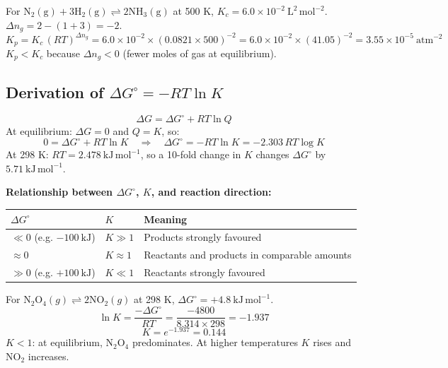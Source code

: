 \documentclass[12pt,a4paper]{article}
\begin{document}
\begin{tcolorbox}[examplebox, title={Solved Example: \texorpdfstring{$K_p$}{Kp} from \texorpdfstring{$K_c$}{Kc}}]
For $\mathrm{N_2(g) + 3H_2(g) \rightleftharpoons 2NH_3(g)}$ at 500 K, $K_c = 6.0\times10^{-2}\ \mathrm{L^2\,mol^{-2}}$.\\
$\Delta n_g = 2 - (1+3) = -2$.
\[
K_p = K_c\,(RT)^{\Delta n_g} = 6.0\times10^{-2}\times(0.0821\times500)^{-2}
= 6.0\times10^{-2}\times(41.05)^{-2} = 3.55\times10^{-5}\ \mathrm{atm^{-2}}
\]
$K_p < K_c$ because $\Delta n_g < 0$ (fewer moles of gas at equilibrium).
\end{tcolorbox}

\subsection{Derivation of \texorpdfstring{$\Delta G^\circ = -RT\ln K$}{Delta G0 = -RT ln K}}

\begin{tcolorbox}[formulabox, title={Free Energy and Equilibrium Constant}]
\[
\Delta G = \Delta G^\circ + RT\ln Q
\]
At equilibrium: $\Delta G = 0$ and $Q = K$, so:
\[
0 = \Delta G^\circ + RT\ln K \quad\Rightarrow\quad \boxed{\Delta G^\circ = -RT\ln K = -2.303\,RT\log K}
\]
At 298 K: $RT = 2.478\ \mathrm{kJ\,mol^{-1}}$, so a 10-fold change in $K$ changes $\Delta G^\circ$ by $5.71\ \mathrm{kJ\,mol^{-1}}$.
\end{tcolorbox}

\textbf{Relationship between $\Delta G^\circ$, $K$, and reaction direction:}\par\noindent
\begin{tabularx}{\linewidth}{|B{2.4cm}|Y|Y|}
\hline
\textbf{$\Delta G^\circ$} & \textbf{$K$} & \textbf{Meaning} \\
\hline
$\ll 0$ (e.g. $-100\ \mathrm{kJ}$) & $K \gg 1$ & Products strongly favoured \\
\hline
$\approx 0$ & $K \approx 1$ & Reactants and products in comparable amounts \\
\hline
$\gg 0$ (e.g. $+100\ \mathrm{kJ}$) & $K \ll 1$ & Reactants strongly favoured \\
\hline
\end{tabularx}

\begin{tcolorbox}[examplebox, title={Solved Example: K from \texorpdfstring{$\Delta G^\circ$}{Delta G0}}]
For $\mathrm{N_2O_4}(g) \rightleftharpoons 2\mathrm{NO_2}(g)$ at 298 K, $\Delta G^\circ = +4.8\ \mathrm{kJ\,mol^{-1}}$.
\[
\ln K = \frac{-\Delta G^\circ}{RT} = \frac{-4800}{8.314\times298} = -1.937
\]
\[
K = e^{-1.937} = 0.144
\]
$K < 1$: at equilibrium, $\mathrm{N_2O_4}$ predominates. At higher temperatures $K$ rises and $\mathrm{NO_2}$ increases.
\end{tcolorbox}
\end{document}
